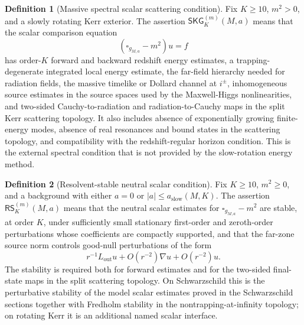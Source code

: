 \documentclass[11pt]{article}
\numberwithin{equation}{section}
\theoremstyle{plain}
\theoremstyle{definition}
\newtheorem{definition}{Definition}[section]
\theoremstyle{remark}
\newcommand{\SKG}{\mathsf{SKG}}
\newcommand{\RSLin}{\mathsf{RS}}
\begin{document}
\begin{definition}[Massive spectral scalar scattering condition]\label{def:external-skg-condition}
Fix \(K\ge10\), \(m^2>0\), and a slowly rotating Kerr exterior.  The assertion \(\SKG^{(m)}_K(M,a)\) means that the scalar comparison equation
\begin{equation}\label{eq:app-SKG-equation}
 (\square_{g_{M,a}}-m^2)u=f
\end{equation}
has order-\(K\) forward and backward redshift energy estimates, a trapping-degenerate integrated local energy estimate, the far-field hierarchy needed for radiation fields, the massive timelike or Dollard channel at \(i^\pm\), inhomogeneous source estimates in the source spaces used by the Maxwell-Higgs nonlinearities, and two-sided Cauchy-to-radiation and radiation-to-Cauchy maps in the split Kerr scattering topology.  It also includes absence of exponentially growing finite-energy modes, absence of real resonances and bound states in the scattering topology, and compatibility with the redshift-regular horizon condition.  This is the external spectral condition that is not provided by the slow-rotation energy method.
\end{definition}


\begin{definition}[Resolvent-stable neutral scalar condition]\label{def:external-rslin-condition}
Fix \(K\ge10\), \(m^2\ge0\), and a background with either \(a=0\) or \(|a|\le a_{\mathrm{slow}}(M,K)\).  The assertion \(\RSLin^{(m)}_K(M,a)\) means that the neutral scalar estimates for \(\square_{g_{M,a}}-m^2\) are stable, at order \(K\), under sufficiently small stationary first-order and zeroth-order perturbations whose coefficients are compactly supported, and that the far-zone source norm controls good-null perturbations of the form
\begin{equation}
 r^{-1}L_{\mathrm{out}}u+O(r^{-2})\nabla u+O(r^{-2})u.
\end{equation}
The stability is required both for forward estimates and for the two-sided final-state maps in the split scattering topology.  On Schwarzschild this is the perturbative stability of the model scalar estimates proved in the Schwarzschild sections together with Fredholm stability in the nontrapping-at-infinity topology; on rotating Kerr it is an additional named scalar interface.
\end{definition}
\end{document}

